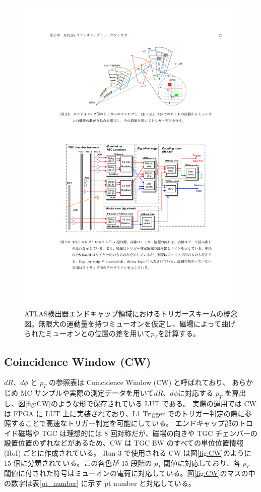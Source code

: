 \begin{figure}[tb]
  \centering
  \includegraphics[clip, width=15cm]{fig/3/akatsuka_mt_trigger_scheme.pdf}
  \caption{ATLAS検出器エンドキャップ領域におけるトリガースキームの概念図\cite{article:akatsuka-mron}。無限大の運動量を持つミューオンを仮定し、磁場によって曲げられたミューオンとの位置の差を用いて$p_T$を計算する。}
  \label{fig:trigger-scheme}
\end{figure}

\subsection{Coincidence Window (CW)}
$dR$、$d\phi$ と $p_T$ の参照表は Coincidence Window (CW) と呼ばれており、
あらかじめ MC サンプルや実際の測定データを用いて$dR$、$d\phi$に対応する $p_T$ を算出し、図\ref{fig:CW}のような形で保存されている LUT である。
実際の運用では CW は FPGA に LUT 上に実装されており、L1 Trigger でのトリガー判定の際に参照することで高速なトリガー判定を可能にしている。
エンドキャップ部のトロイド磁場や TGC は理想的には 8 回対称だが、磁場の向きや TGC チェンバーの設置位置のずれなどがあるため、CW は TGC BW のすべての単位位置情報 (RoI) ごとに作成されている。
Run-3 で使用される CW は図\ref{fig:CW}のように 15 個に分類されている。この各色が 15 段階の $p_T$ 閾値に対応しており、各 $p_T$ 閾値に付された符号はミューオンの電荷に対応している。図\ref{fig:CW}のマスの中の数字は表\ref{pt_number} に示す pt number と対応している。


